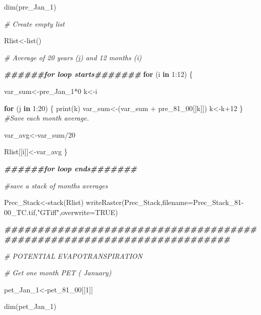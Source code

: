 \documentclass[
  10pt,
  b5paper,
]{book}
\newenvironment{Shaded}{\begin{snugshade}}{\end{snugshade}}
\newcommand{\AttributeTok}[1]{\textcolor[rgb]{0.77,0.63,0.00}{#1}}
\newcommand{\CommentTok}[1]{\textcolor[rgb]{0.56,0.35,0.01}{\textit{#1}}}
\newcommand{\ConstantTok}[1]{\textcolor[rgb]{0.00,0.00,0.00}{#1}}
\newcommand{\ControlFlowTok}[1]{\textcolor[rgb]{0.13,0.29,0.53}{\textbf{#1}}}
\newcommand{\DecValTok}[1]{\textcolor[rgb]{0.00,0.00,0.81}{#1}}
\newcommand{\DocumentationTok}[1]{\textcolor[rgb]{0.56,0.35,0.01}{\textbf{\textit{#1}}}}
\newcommand{\FunctionTok}[1]{\textcolor[rgb]{0.00,0.00,0.00}{#1}}
\newcommand{\NormalTok}[1]{#1}
\newcommand{\OtherTok}[1]{\textcolor[rgb]{0.56,0.35,0.01}{#1}}
\newcommand{\SpecialCharTok}[1]{\textcolor[rgb]{0.00,0.00,0.00}{#1}}
\newcommand{\StringTok}[1]{\textcolor[rgb]{0.31,0.60,0.02}{#1}}
\begin{document}
\begin{Shaded}
\begin{Highlighting}[]
\FunctionTok{dim}\NormalTok{(pre\_Jan\_1)}

\CommentTok{\# Create empty list}

\NormalTok{Rlist}\OtherTok{\textless{}{-}}\FunctionTok{list}\NormalTok{()}

\CommentTok{\# Average of 20 years (j)  and 12 months (i) }

\DocumentationTok{\#\#\#\#\#\#for loop starts\#\#\#\#\#\#\#}
\ControlFlowTok{for}\NormalTok{ (i }\ControlFlowTok{in} \DecValTok{1}\SpecialCharTok{:}\DecValTok{12}\NormalTok{) \{ }

\NormalTok{var\_sum}\OtherTok{\textless{}{-}}\NormalTok{pre\_Jan\_1}\SpecialCharTok{*}\DecValTok{0}
\NormalTok{k}\OtherTok{\textless{}{-}}\NormalTok{i}

\ControlFlowTok{for}\NormalTok{ (j }\ControlFlowTok{in} \DecValTok{1}\SpecialCharTok{:}\DecValTok{20}\NormalTok{) \{}
\FunctionTok{print}\NormalTok{(k)}
\NormalTok{var\_sum}\OtherTok{\textless{}{-}}\NormalTok{(var\_sum }\SpecialCharTok{+}\NormalTok{ pre\_81\_00[[k]])}
\NormalTok{k}\OtherTok{\textless{}{-}}\NormalTok{k}\SpecialCharTok{+}\DecValTok{12}
\NormalTok{\}}
\CommentTok{\#Save each month average. }

\NormalTok{var\_avg}\OtherTok{\textless{}{-}}\NormalTok{var\_sum}\SpecialCharTok{/}\DecValTok{20}

\NormalTok{Rlist[[i]]}\OtherTok{\textless{}{-}}\NormalTok{var\_avg}
\NormalTok{\}}

\DocumentationTok{\#\#\#\#\#\#for loop ends\#\#\#\#\#\#\#}

\CommentTok{\#save a stack of months averages}

\NormalTok{Prec\_Stack}\OtherTok{\textless{}{-}}\FunctionTok{stack}\NormalTok{(Rlist)}
\FunctionTok{writeRaster}\NormalTok{(Prec\_Stack,}\AttributeTok{filename=}\StringTok{\textquotesingle{}Prec\_Stack\_81{-}00\_TC.tif\textquotesingle{}}\NormalTok{,}\StringTok{"GTiff"}\NormalTok{,}\AttributeTok{overwrite=}\ConstantTok{TRUE}\NormalTok{)}

\DocumentationTok{\#\#\#\#\#\#\#\#\#\#\#\#\#\#\#\#\#\#\#\#\#\#\#\#\#\#\#\#\#\#\#\#\#\#\#\#\#\#\#\#\#\#\#\#\#\#\#\#\#\#\#\#\#\#\#\#\#\#\#\#\#\#\#\#\#\#\#\#\#\#\#\#}

\CommentTok{\# POTENTIAL EVAPOTRANSPIRATION }


\CommentTok{\# Get one month PET ( January)}

\NormalTok{pet\_Jan\_1}\OtherTok{\textless{}{-}}\NormalTok{pet\_81\_00[[}\DecValTok{1}\NormalTok{]]}

\FunctionTok{dim}\NormalTok{(pet\_Jan\_1)}


\end{Highlighting}
\end{Shaded}
\end{document}
